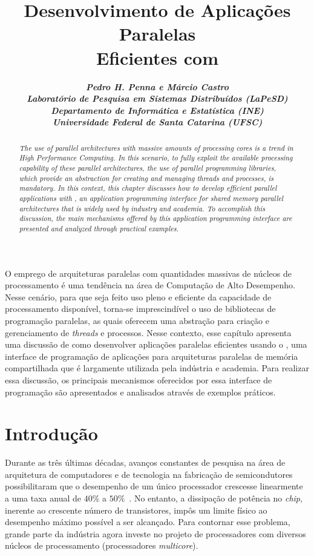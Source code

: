 \documentclass{SBCbookchapter}
\author{%
	\textbf{\textit{Pedro H. Penna e Márcio Castro} \\
	\textit{Laboratório de Pesquisa em Sistemas Distribuídos (LaPeSD)} \\
	\textit{Departamento de Informática e Estatística (INE)}           \\
	\textit{Universidade Federal de Santa Catarina (UFSC)}}
}
\title{Desenvolvimento de Aplicações Paralelas\\Eficientes com \openmp}
\begin{document}
\maketitle

\begin{resumo}
	O emprego de arquiteturas paralelas com quantidades massivas de
	núcleos de processamento é uma tendência na área de Computação de
	Alto Desempenho. Nesse cenário, para que seja feito uso pleno e
	eficiente da capacidade de processamento disponível, torna-se
	imprescindível o uso de bibliotecas de programação paralelas, as
	quais oferecem uma abstração para criação e gerenciamento de
	\textit{threads} e processos. Nesse contexto, esse capítulo
	apresenta uma discussão de como desenvolver aplicações paralelas
	eficientes usando o \openmp, uma interface de programação de
	aplicações para arquiteturas paralelas de memória compartilhada que
	é largamente utilizada pela indústria e academia. Para realizar essa
	discussão, os principais mecanismos oferecidos por essa interface de
	programação são apresentados e analisados através de exemplos
	práticos.
\end{resumo}

\begin{abstract}
	\textit{The use of parallel architectures with massive amounts of
	processing cores is a trend in High Performance Computing.
	In this scenario, to fully exploit the available processing capability
	of these parallel architectures, the use of parallel programming libraries,
	which provide an abstraction for creating and managing
	threads and processes, is mandatory. In this context, this chapter
	discusses how to develop efficient parallel applications with
	\openmp, an application programming interface for shared memory parallel
	architectures that is widely used by industry and academia. To accomplish
	this discussion, the main mechanisms offered by this application programming
	interface are presented and analyzed through practical examples.}
\end{abstract}

\section{Introdução}

	Durante as três últimas décadas, avanços constantes de pesquisa na
	área de arquitetura de computadores e de tecnologia na fabricação de
	semicondutores possibilitaram que o desempenho de um único
	processador crescesse linearmente a uma taxa anual de $40\%$ a
	$50\%$~\cite{LARUS08}. No entanto, a dissipação de potência no
	\textit{chip}, inerente ao crescente número de transistores, impôs
	um limite físico ao desempenho máximo possível a ser alcançado.
	Para contornar esse problema, grande parte da indústria agora
	investe no projeto de processadores com diversos núcleos de
	processamento (processadores \textit{multicore}).
\end{document}
